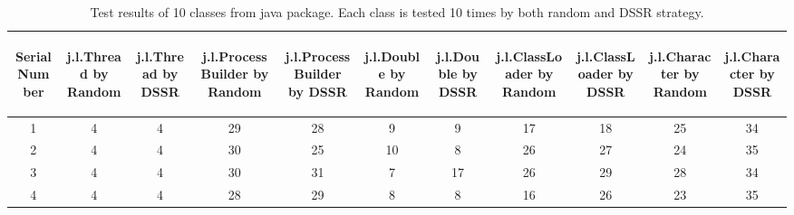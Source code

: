 \documentclass[10pt, conference, compsocconf]{IEEEtran}
\begin{document}
\begin{table}[ht]
\caption{Test results of 10 classes from java package. Each class is tested 10 times by both random and DSSR strategy.} %
\centering %

\begin{tabular}{| c | c | c | c | c | c | c | c | c | c | c |} %
\hline\hline %
 \begin{sideways} Serial Number \end{sideways} & \begin{sideways} j.l.Thread by Random \end{sideways} &  \begin{sideways} j.l.Thread by DSSR \end{sideways} &  \begin{sideways} j.l.ProcessBuilder by Random \end{sideways} &  \begin{sideways} j.l.ProcessBuilder by DSSR \end{sideways} &  \begin{sideways} j.l.Double by Random \end{sideways} & \begin{sideways} j.l.Double by DSSR \end{sideways} &  \begin{sideways} j.l.ClassLoader by Random \end{sideways} &  \begin{sideways} j.l.ClassLoader by DSSR \end{sideways} & \begin{sideways} j.l.Character by Random \end{sideways} & \begin{sideways} j.l.Character by DSSR \end{sideways} \\ [0.5ex] %
\hline %
1 & 4 & 4 & 29 & 28 & 9 & 9 & 17 & 18 & 25 & 34\\ %

2 & 4 & 4 & 30 & 25 & 10 & 8 & 26 & 27 & 24 & 35\\

3 & 4 & 4 & 30 & 31 & 7 & 17 & 26 & 29 & 28 & 34\\

4 & 4 & 4 & 28 & 29 & 8 & 8 & 16 & 26 & 23 & 35\\


\end{tabular}
\end{table}
\end{document}
